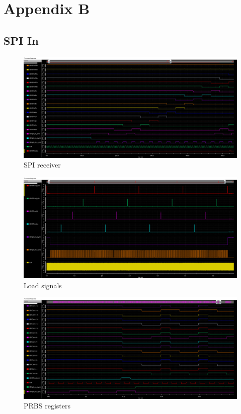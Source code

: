 \section{Appendix B}
\label{app:simulations}
\subsection{SPI In}

\begin{figure}[H]
  \centering
  \captionsetup{justification=centering}
  \includegraphics[angle=90, scale=0.44]{../figures/test2_spi_in}
  \caption{SPI receiver} 
\end{figure}

\begin{figure}[H]
  \centering
  \captionsetup{justification=centering}
  \includegraphics[angle=90, scale=0.46]{../figures/test2_spi_load}
  \caption{Load signals}
\end{figure}

\begin{figure}[H]
  \centering
  \captionsetup{justification=centering}
  \includegraphics[angle=90, scale=0.46]{../figures/test2_spi_abc}
  \caption{PRBS registers}
\end{figure}

